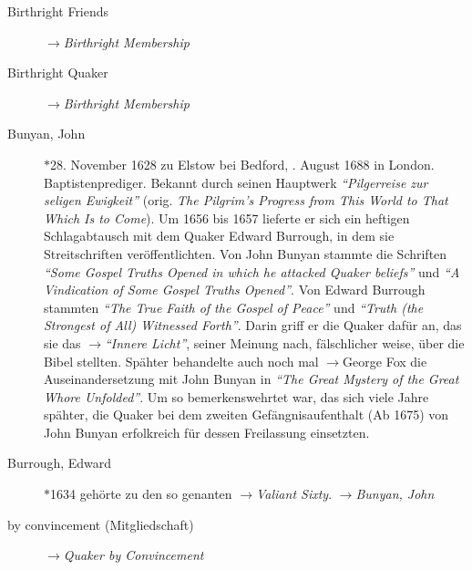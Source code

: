 \begin{description}
 \item[Birthright Friends] $\to$\textit{Birthright Membership}
 
 \item[Birthright Quaker] $\to$\textit{Birthright Membership}

 \item[Bunyan, John] $\ast$28. November 1628 zu Elstow bei Bedford, .
August 1688 in London. Baptistenprediger. Bekannt durch seinen Hauptwerk
\textit{"`Pilgerreise zur seligen Ewigkeit"'} (orig. \textit{The Pilgrim’s
Progress from This World to That Which Is to Come}). Um 1656 bis 1657 lieferte
er sich ein heftigen Schlagabtausch mit dem Quaker Edward Burrough, in dem sie
Streitschriften veröffentlichten. Von John Bunyan stammte die Schriften
\textit{"`Some Gospel Truths Opened in which he attacked Quaker beliefs"'} und
\textit{"`A Vindication of Some Gospel Truths Opened"'}. Von Edward Burrough
stammten \textit{"`The True Faith of the Gospel of Peace"'} und \textit{"`Truth
(the Strongest of All) Witnessed Forth"'}. Darin griff er die Quaker dafür an,
das sie das $\to$\textit{"`Innere Licht"'}, seiner Meinung nach, fälschlicher
weise, über die Bibel stellten. Spähter behandelte auch noch mal $\to$George Fox
die Auseinandersetzung mit John Bunyan in \textit{"`The Great Mystery of the
Great Whore Unfolded"'}. Um so bemerkenswehrtet war, das sich viele Jahre
spähter, die Quaker bei dem zweiten Gefängnisaufenthalt (Ab 1675) von John
Bunyan erfolkreich für dessen Freilassung einsetzten.

 \item[Burrough, Edward] $\ast$1634  gehörte zu den so genanten
$\to$\textit{Valiant Sixty}. $\to$\textit{Bunyan, John}


 \item[by convincement (Mitgliedschaft)] $\to$\textit{Quaker by Convincement}
 \end{description}

\normalsize

